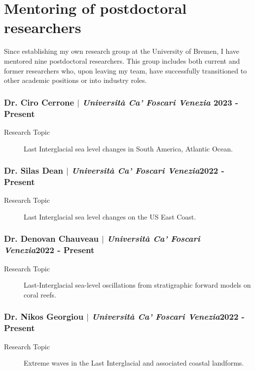 \documentclass[11pt]{article}
\begin{document}
\section{Mentoring of postdoctoral researchers}
{\normalfont Since establishing my own research group at the University of Bremen, I have mentored nine postdoctoral researchers. This group includes both current and former researchers who, upon leaving my team, have successfully transitioned to other academic positions or into industry roles.}\\
\subsubsection{Dr. Ciro Cerrone $|$ {\normalfont\textit{Università Ca' Foscari Venezia}} \hfill 2023 - Present}
{\footnotesize 
\begin{description}
  \item [Research Topic] Last Interglacial sea level changes in South America, Atlantic Ocean. 
\end{description}
}
\smallskip

\subsubsection{Dr. Silas Dean $|$ {\normalfont\textit{Università Ca' Foscari Venezia}}\hfill 2022 - Present}
{\footnotesize 
\begin{description}
  \item [Research Topic] Last Interglacial sea level changes on the US East Coast. 
\end{description}
}
\smallskip
\subsubsection{Dr. Denovan Chauveau $|$ {\normalfont\textit{Università Ca' Foscari Venezia}}\hfill 2022 - Present}
{\footnotesize 
\begin{description}
  \item [Research Topic] Last-Interglacial sea-level oscillations from stratigraphic forward models on coral reefs. 
\end{description}
}

\smallskip
\subsubsection{Dr. Nikos Georgiou $|$ {\normalfont\textit{Università Ca' Foscari Venezia}}\hfill 2022 - Present}
{\footnotesize 
\begin{description}
  \item [Research Topic] Extreme waves in the Last Interglacial and associated coastal landforms. 
\end{description}
}
\smallskip
\end{document}
